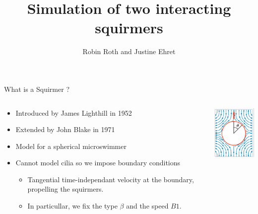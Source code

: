 \documentclass{beamer}
\title{Simulation of two interacting squirmers}
\author{Robin Roth and Justine Ehret}
\institute{Supervised by: Van Landeghem Céline, Giraldi Laetitia}
\begin{document}
\begin{frame}
    \titlepage
\end{frame}

\begin{frame}{What is a Squirmer ?}
    \begin{columns}[T]
        \begin{column}{0.5\textwidth}
            \begin{itemize}
                \item Introduced by James Lighthill in 1952 \cite{Wikipedia}
                \item Extended by John Blake in 1971 \cite{Wikipedia}
                \item Model for a spherical microswimmer
                \item Cannot model cilia so we impose boundary conditions
                \begin{itemize}
                    \item Tangential time-independant velocity at the boundary, propelling the squirmers.
                    \item In particullar, we fix the type $\beta$ and the speed $B1$.
                \end{itemize}
            \end{itemize}
        \end{column}
        \begin{column}{0.5\textwidth}
            \centering
            \includegraphics[width=\textwidth]{../images/squirmer.png}
            \cite{Wikipedia}
        \end{column}
    \end{columns}
\end{frame}
\end{document}

